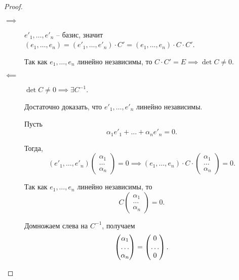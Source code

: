 \begin{proof}~
    \begin{description}
        \item[$\implies$] 
            $e'_1, \dots, e'_n$ -- базис, значит $(e_1, \dots, e_n) = (e'_1, \dots, e'_n) \cdot C' = (e_1, \dots, e_n) \cdot C \cdot C'$.

            Так как $e_1, \dots, e_n$ линейно независимы, то $C \cdot C' = E \implies \det C \neq 0$.

        \item[$\impliedby$]
            $\det C \neq 0 \implies \exists C^{-1}$.

            Достаточно доказать, что $e'_1, \dots, e'_n$ линейно независимы.

            Пусть
            \begin{equation*}
                \alpha_1 e'_1 + \dots + \alpha_n e'_n = 0
            .\end{equation*}

            Тогда,
            \begin{equation*}
                (e'_1, \dots, e'_n) \begin{pmatrix} \alpha_1 \\ \dots \\ \alpha_n \end{pmatrix} = 0
                \implies (e_1, \dots, e_n) \cdot C \cdot \begin{pmatrix} \alpha_1 \\ \dots \\ \alpha_n \end{pmatrix} = 0
            .\end{equation*}

            Так как $e_1, \dots, e_n$ линейно независимы, то
            \begin{equation*}
                C \begin{pmatrix} \alpha_1 \\ \dots \\ \alpha_n \end{pmatrix} = 0
            .\end{equation*}

            Домножаем слева на $C^{-1}$, получаем
            \begin{equation*}
                \begin{pmatrix} \alpha_1 \\ \dots \\ \alpha_n \end{pmatrix} = \begin{pmatrix} 0 \\ \dots \\ 0 \end{pmatrix}
            .\qedhere\end{equation*}
    \end{description}
\end{proof}


